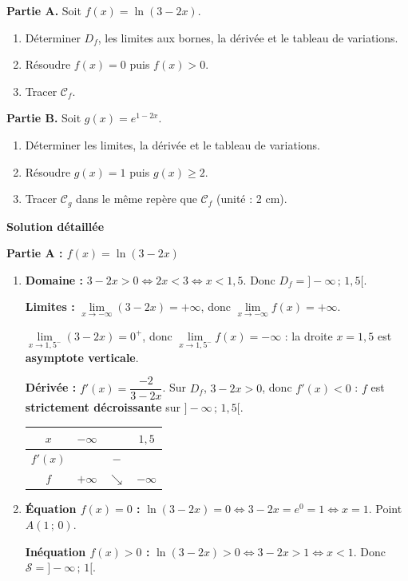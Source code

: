 \documentclass[11pt]{article}
\begin{document}
\begin{exoresolu}[Étude de $f(x)=\ln(3-2x)$ et $g(x)=e^{1-2x}$]
\textbf{Partie A.} Soit $f(x) = \ln(3-2x)$.
\begin{enumerate}
    \item Déterminer $D_f$, les limites aux bornes, la dérivée et le tableau de variations.
    \item Résoudre $f(x) = 0$ puis $f(x) > 0$.
    \item Tracer $\mathcal{C}_f$.
\end{enumerate}
\textbf{Partie B.} Soit $g(x) = e^{1-2x}$.
\begin{enumerate}
    \item Déterminer les limites, la dérivée et le tableau de variations.
    \item Résoudre $g(x) = 1$ puis $g(x) \geqslant 2$.
    \item Tracer $\mathcal{C}_g$ dans le même repère que $\mathcal{C}_f$ (unité : 2 cm).
\end{enumerate}
\tcblower
\textbf{Solution détaillée}

\textbf{Partie A : $f(x) = \ln(3-2x)$}
\begin{enumerate}
    \item \textbf{Domaine :} $3-2x > 0 \iff 2x < 3 \iff x < 1,5$. Donc $D_f = ]-\infty\,;\, 1,5[$.

    \textbf{Limites :} $\lim\limits_{x\to -\infty} (3-2x) = +\infty$, donc $\lim\limits_{x\to -\infty} f(x) = +\infty$.

    $\lim\limits_{x\to 1,5^-} (3-2x) = 0^+$, donc $\lim\limits_{x\to 1,5^-} f(x) = -\infty$ : la droite $x = 1,5$ est \textbf{asymptote verticale}.

    \textbf{Dérivée :} $f'(x) = \dfrac{-2}{3-2x}$. Sur $D_f$, $3-2x > 0$, donc $f'(x) < 0$ : $f$ est \textbf{strictement décroissante} sur $]-\infty\,;\,1,5[$.
    \begin{center}
    \begin{tabular}{|c|ccc|}\hline
    $x$ & $-\infty$ & & $1,5$ \\ \hline
    $f'(x)$ & & $-$ & \\ \hline
    $f$ & $+\infty$ & $\searrow$ & $-\infty$ \\ \hline
    \end{tabular}
    \end{center}
    \item \textbf{Équation $f(x)=0$ :} $\ln(3-2x)=0 \iff 3-2x=e^0=1 \iff x=1$. Point $A(1\,;\,0)$.

    \textbf{Inéquation $f(x)>0$ :} $\ln(3-2x) > 0 \iff 3-2x > 1 \iff x < 1$. Donc $\mathcal{S} = ]-\infty\,;\, 1[$.


\end{enumerate}
\end{exoresolu}
\end{document}
